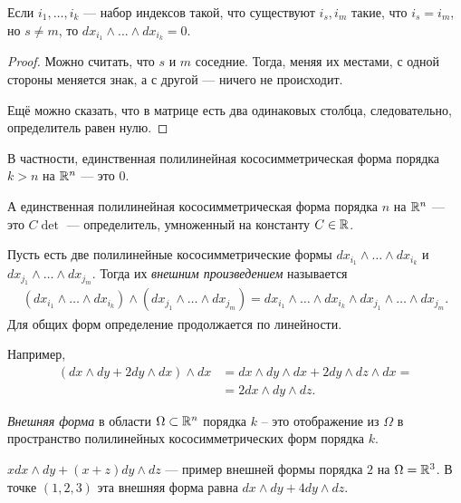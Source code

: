 \begin{remrk}
 Если $i_1, \ldots, i_k$ --- набор индексов такой, что существуют $i_s, i_m$ такие, что $i_s = i_m$, но $s \neq m$, то $dx_{i_1} \land \ldots \land dx_{i_k} = 0$.
\end{remrk}
\begin{proof}
 Можно считать, что $s$ и $m$ соседние. Тогда, меняя их местами, с одной стороны меняется знак, а с другой --- ничего не происходит.

 Ещё можно сказать, что в матрице есть два одинаковых столбца, следовательно, определитель равен нулю.
\end{proof}
\begin{crly}
 В частности, единственная полилинейная кососимметрическая форма порядка $k > n$ на $\mathbb{R}^{n}$ --- это $0$.

 А единственная полилинейная кососимметрическая форма порядка $n$ на $\mathbb{R}^{n}$ --- это $C \det$ --- определитель, умноженный на константу $C \in \mathbb{R}$.
\end{crly}
\begin{df}
Пусть есть две полилинейные кососимметрические формы $dx_{i_1} \land \ldots \land dx_{i_k}$  и $dx_{j_1} \land \ldots \land dx_{j_m}$. Тогда их \textit{внешним произведением} называется
 \begin{align*}
  (dx_{i_1} \land \ldots \land dx_{i_k}) \land (dx_{j_1} \land \ldots \land dx_{j_m}) = dx_{i_1} \land \ldots \land dx_{i_k} \land dx_{j_1} \land \ldots \land dx_{j_m}
 .\end{align*} Для общих форм определение продолжается по линейности.

 Например,
 \begin{align*}
  (dx \land dy + 2dy \land dx) \land dx &= dx \land dy \land dx + 2 dy \land dz \land dx = \\
  &= 2 dx \land dy \land dz
 .\end{align*} 
\end{df}

\begin{df}
 \textit{Внешняя форма} в области $\Omega \subset \mathbb{R}^{n}$ порядка $k$ -- это отображение из $\Omega$ в пространство полилинейных кососимметрических форм порядка $k$.
\end{df}
\begin{exmpl}
 $x dx \land dy + (x + z) dy \land dz$ --- пример внешней формы порядка $2$ на $\Omega = \mathbb{R}^{3}$. В точке $(1,2,3)$ эта внешняя форма равна $ dx \land dy + 4 dy \land dz $.
\end{exmpl}

